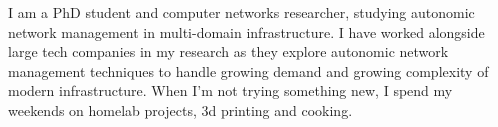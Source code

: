 \documentclass[9pt]{developercv} %
\begin{document}
\begin{minipage}[t]{0.35\textwidth} %
	\vspace{-\baselineskip} %
	I am a PhD student and computer networks researcher, studying autonomic
	network management in multi-domain infrastructure. I have worked alongside
	large tech companies in my research as they explore autonomic network
	management techniques to handle growing demand and growing complexity of
	modern infrastructure. When I'm not trying something new, I spend my
	weekends on homelab projects, 3d printing and cooking.\\
\end{minipage}
\hfill %
\begin{minipage}[t]{0.31\textwidth} %
	\vspace{-\baselineskip} %
	\begin{barchart}{4.1}
	\end{barchart}
\end{minipage}
\hfill %
\begin{minipage}[t]{0.29\textwidth} %
	\vspace{-\baselineskip}\vspace{-\baselineskip} %
	\\
	\mbox{}
	\mbox{}
	\mbox{}
	\mbox{}
	\mbox{}
\end{minipage}


\vspace{-1em}
\end{document}
